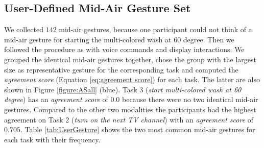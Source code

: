 \documentclass[sigchi]{acmart}
\begin{document}
	\subsection{User-Defined Mid-Air Gesture Set}
	We collected $142$ mid-air gestures, because one participant could not think of a mid-air gesture for starting the  multi-colored wash at $60$ degree. Then we followed the procedure as with voice commands and display interactions. We grouped the identical mid-air gestures together, chose the group with the largest size as representative gesture for the corresponding task and computed the \textit{agreement score} (Equation \ref{eq:agreement score}) for each task. The latter are also shown in Figure \ref{figure:ASall} (blue). Task 3 (\textit{start multi-colored wash at 60 degree}) has an \textit{agreement score} of $0.0$ because there were no two identical mid-air gestures. Compared to the other two modalities the participants had the highest agreement on Task 2 (\textit{turn on the next TV channel}) with an \textit{agreement score} of $0.705$. Table \ref{tab:UserGesture} shows the two most common mid-air gestures for each task with their frequency.
\end{document}
